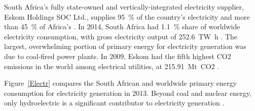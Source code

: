South Africa's fully state-owned and vertically-integrated electricity supplier, Eskom Holdings SOC Ltd., supplies \SI{95}{\percent} of the country's electricity and more than \SI{45}{\percent} of Africa's \cite{EskomGenerationDivision2014}. In 2014, South Africa had \SI{1.1}{\percent} share of worldwide electricity consumption, with gross electricity output of \SI{252.6}{\tera\watt\hour} \cite{BP2015c}.
The largest, overwhelming portion of primary energy for electricity generation was due to coal-fired power plants. In 2009, Eskom had the fifth highest \ac{CO2} emissions in the world among electrical utilities, at \SI{215.91}{\mega\tonne}~\ac{CO2} \cite{CARMA2015}.


Figure~\ref{Electr} compares the South African and worldwide primary energy consumption for electricity generation in 2013. Beyond coal and nuclear energy, only hydroelectric is a significant contributor to electricity generation \cite{Agency2015}.

